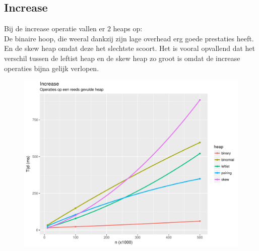 \documentclass[a4paper,12pt]{report}
\begin{document}
\subsection{Increase}
Bij de increase operatie vallen er 2 heaps op: \\
De binaire hoop, die weeral dankzij zijn lage overhead erg goede prestaties heeft. \\
En de skew heap omdat deze het slechtste scoort. Het is vooral opvallend dat het verschil tussen de leftist heap en de skew heap zo groot is omdat de increase operaties bijna gelijk verlopen.
\begin{figure}[H]
	\includegraphics[scale=0.9]{grafieken/increase}
\end{figure}
\end{document}
